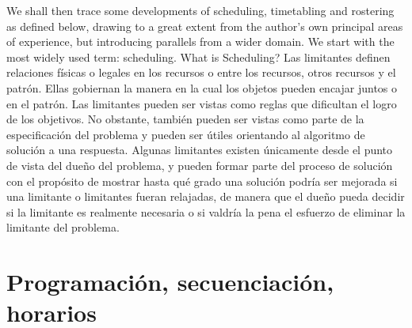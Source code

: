 \documentclass[draft,12pt,headsepline,footsepline,paper=letter]{scrreprt}
\begin{document}
We shall then trace some developments of scheduling, timetabling and rostering as defined below, drawing to a great extent from the author's own principal areas of experience, but introducing parallels from a wider domain.
We start with the most widely used term: scheduling. What is Scheduling?
\fi
Las limitantes definen relaciones físicas o legales en los recursos o entre los recursos, otros recursos y el patrón. Ellas gobiernan la manera en la cual los objetos pueden encajar juntos o en el patrón. Las limitantes pueden ser vistas como reglas que dificultan el logro de los objetivos. No obstante, también pueden ser vistas como parte de la especificación del problema y pueden ser útiles orientando al algoritmo de solución a una respuesta. Algunas limitantes existen únicamente desde el punto de vista del dueño del problema, y pueden formar parte del proceso de solución con el propósito de mostrar hasta qué grado una solución podría ser mejorada si una limitante o limitantes fueran relajadas, de manera que el dueño pueda decidir si la limitante es realmente necesaria o si valdría la pena el esfuerzo de eliminar la limitante del problema.

\section{Programación, secuenciación, horarios} %
\label{sec:definiciones}

\end{document}
